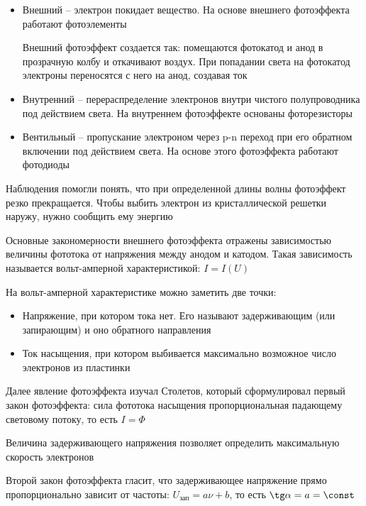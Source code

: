 \documentclass[12pt]{article}
\begin{document}
\begin{itemize}
    \item Внешний -- электрон покидает вещество. На основе внешнего фотоэффекта работают фотоэлементы
    
    Внешний фотоэффект создается так: помещаются фотокатод и анод в прозрачную колбу и откачивают воздух. При попадании света на фотокатод электроны переносятся с него на анод, создавая ток 

    \item Внутренний -- перераспределение электронов внутри чистого полупроводника под действием света. На внутреннем фотоэффекте основаны фоторезисторы

    \item Вентильный -- пропускание электроном через p-n переход при его обратном включении под действием света. На основе этого фотоэффекта работают фотодиоды
\end{itemize}


Наблюдения помогли понять, что при определенной длины волны фотоэффект резко прекращается. Чтобы выбить электрон из кристаллической решетки наружу, нужно сообщить ему энергию

Основные закономерности внешнего фотоэффекта отражены зависимостью величины фототока от напряжения между анодом и катодом. Такая зависимость называется вольт-амперной характеристикой: $I = I(U)$


На вольт-амперной характеристике можно заметить две точки:

\begin{itemize}
    \item Напряжение, при котором тока нет. Его называют задерживающим (или запирающим) и оно обратного направления
    \item Ток насыщения, при котором выбивается максимально возможное число электронов из пластинки
\end{itemize}

\mediumvspace

Далее явление фотоэффекта изучал Столетов, который сформулировал первый закон фотоэффекта: сила фототока насыщения пропорциональная падающему световому потоку, то есть $I = \Phi$

Величина задерживающего напряжения позволяет определить максимальную скорость электронов

Второй закон фотоэффекта гласит, что задерживающее напряжение прямо пропорционально зависит от частоты: $U_\text{зап} = a\nu + b$, то есть $\tg \alpha = a = \const$
\end{document}
